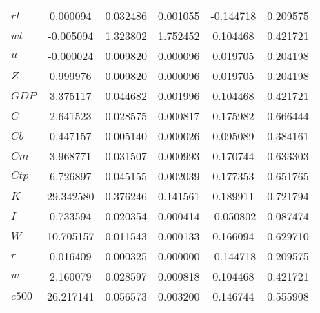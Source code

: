 \begin{center}
\begin{longtable}{lccccc}
$rt        $	 & 	        0.000094	 & 	        0.032486	 & 	        0.001055	 & 	       -0.144718	 & 	        0.209575 \\ 
$wt        $	 & 	       -0.005094	 & 	        1.323802	 & 	        1.752452	 & 	        0.104468	 & 	        0.421721 \\ 
$u         $	 & 	       -0.000024	 & 	        0.009820	 & 	        0.000096	 & 	        0.019705	 & 	        0.204198 \\ 
$Z         $	 & 	        0.999976	 & 	        0.009820	 & 	        0.000096	 & 	        0.019705	 & 	        0.204198 \\ 
$GDP       $	 & 	        3.375117	 & 	        0.044682	 & 	        0.001996	 & 	        0.104468	 & 	        0.421721 \\ 
$C         $	 & 	        2.641523	 & 	        0.028575	 & 	        0.000817	 & 	        0.175982	 & 	        0.666444 \\ 
$Cb        $	 & 	        0.447157	 & 	        0.005140	 & 	        0.000026	 & 	        0.095089	 & 	        0.384161 \\ 
$Cm        $	 & 	        3.968771	 & 	        0.031507	 & 	        0.000993	 & 	        0.170744	 & 	        0.633303 \\ 
$Ctp       $	 & 	        6.726897	 & 	        0.045155	 & 	        0.002039	 & 	        0.177353	 & 	        0.651765 \\ 
$K         $	 & 	       29.342580	 & 	        0.376246	 & 	        0.141561	 & 	        0.189911	 & 	        0.721794 \\ 
$I         $	 & 	        0.733594	 & 	        0.020354	 & 	        0.000414	 & 	       -0.050802	 & 	        0.087474 \\ 
$W         $	 & 	       10.705157	 & 	        0.011543	 & 	        0.000133	 & 	        0.166094	 & 	        0.629710 \\ 
$r         $	 & 	        0.016409	 & 	        0.000325	 & 	        0.000000	 & 	       -0.144718	 & 	        0.209575 \\ 
$w         $	 & 	        2.160079	 & 	        0.028597	 & 	        0.000818	 & 	        0.104468	 & 	        0.421721 \\ 
$c500      $	 & 	       26.217141	 & 	        0.056573	 & 	        0.003200	 & 	        0.146744	 & 	        0.555908 \\ 
\end{longtable}
 \end{center}
